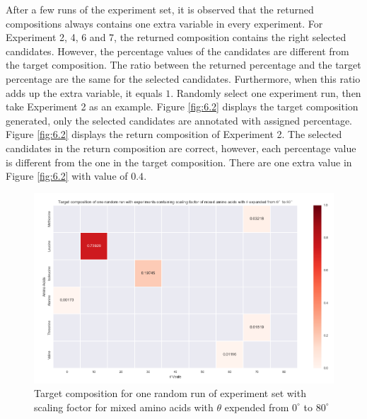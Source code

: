 After a few runs of the experiment set, it is observed that the returned compositions always contains one extra variable in every experiment. For Experiment 2, 4, 6 and 7, the returned composition contains the right selected candidates. However, the percentage values of the candidates are different from the target composition. The ratio between the returned percentage and the target percentage are the same for the selected candidates. Furthermore, when this ratio adds up the extra variable, it equals $1$. Randomly select one experiment run, then take Experiment 2 as an example. Figure \ref{fig:6.2} displays the target composition generated, only the selected candidates are annotated with assigned percentage. Figure \ref{fig:6.2} displays the return composition of Experiment 2. The selected candidates in the return composition are correct, however, each percentage value is different from the one in the target composition. There are one extra value in Figure \ref{fig:6.2} with value of $0.4$. \\

\begin{figure}[!ht] 
\centering
\includegraphics[scale=0.5]{Figures/chapter6_figure_one.png}
\caption{Target composition for one random run of experiment set with scaling foctor for mixed amino acids with $\theta$ expended from $0^{\circ}$ to $80^{\circ}$} \label{fig:6.1}
\end{figure}

